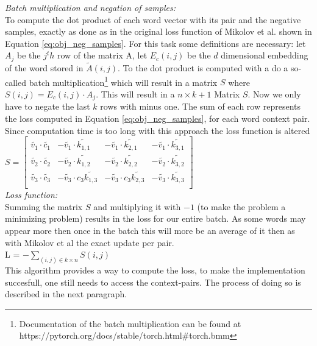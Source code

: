  \textit{Batch multiplication and negation of samples:}\\ 
 To compute the dot product of each word vector with its pair and the negative samples, exactly as done as in the original loss function of Mikolov et al. shown in Equation \ref{eq:obj_neg_samples}. For this task some definitions are necessary: let $A_j$ be the $j^th$ row of the matrix A, let $E_c(i,j)$ be the $d$ dimensional embedding of the word stored in $\tilde{A}(i,j)$. To the dot product is computed with a do a so-called batch multiplication\footnote{Documentation of the batch multiplication  can be found at https://pytorch.org/docs/stable/torch.html\#torch.bmm} which will result in a matrix $S$ where $S(i,j) = E_c(i,j) \cdot A_j$. This will result in a $n\times k+1$ Matrix $S$. Now we only have to negate the last $k$ rows with minus one. The sum of each row represents the loss computed in Equation \ref{eq:obj_neg_samples}, for each word context pair.
 Since computation time is too long with this approach the loss function is altered\\
  $S = \begin{bmatrix}
\tilde{v_1} \cdot  \tilde{c_1} & -\tilde{v_1} \cdot \tilde{k_{1,1}} & -\tilde{v_1} \cdot  \tilde{k_{2,1}}& -\tilde{v_1} \cdot  \tilde{k_{3,1}}\\
\tilde{v_2} \cdot \tilde{c_2} & -\tilde{v_2} \cdot \tilde{k_{1,2}} & -\tilde{v_2} \cdot \tilde{k_{2,2}} & -\tilde{v_2} \cdot \tilde{k_{3,2}}\\
\tilde{v_3} \cdot \tilde{c_3} &-\tilde{v_3} \cdot c_3  \tilde{k_{1,3}} & -\tilde{v_3} \cdot c_3 \tilde{k_{2,3}}&-\tilde{v_3} \cdot \tilde{k_{3,3}}\\
\end{bmatrix}$\\

\textit{Loss function:}\\
Summing the matrix $S$ and multiplying it with $-1$ (to make the problem a minimizing problem) results in the loss for our entire batch. As some words may appear more then once in the batch this will more be an average of it then as with Mikolov et al the exact update per pair. \\
 L = $- \sum_{(i,j) \in k \times n} S(i,j) $\\

This algorithm provides a way to compute the loss, to make the implementation succesfull, one still needs to access the context-pairs. The process of doing so is described in the next paragraph.

